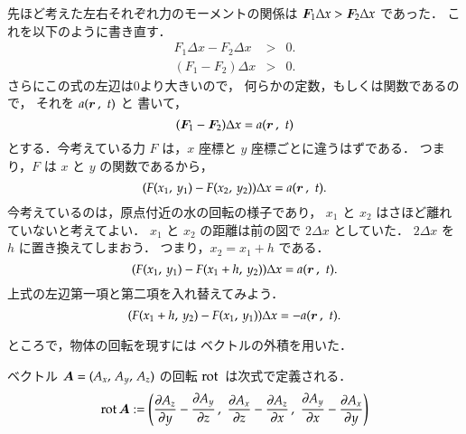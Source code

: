         先ほど考えた左右それぞれ力のモーメントの関係は $\boldsymbol{F}_{1}\Delta x > \boldsymbol{F}_{2}\Delta x$ であった．
        これを以下のように書き直す．
            \begin{align*}
                F_{1}\Delta x - F_{2}\Delta x &>& 0.  \\
                (F_{1} - F_{2})\Delta x &>& 0.
            \end{align*}
        さらにこの式の左辺は0より大きいので，
        何らかの定数，もしくは関数であるので，
        それを $a(\boldsymbol{r}\,,\,\,t)$ と
        書いて，
            \begin{equation*}
                (\boldsymbol{F}_{1} - \boldsymbol{F}_{2})\Delta x =a(\boldsymbol{r}\,,\,\,t)
            \end{equation*}
        とする．今考えている力 $F$ は，$x$ 座標と $y$ 座標ごとに違うはずである．
        つまり，$F$ は $x$ と $y$ の関数であるから，
            \begin{equation*}
                ( F(x_{1} ,\, y_{1}) - F(x_{2} ,\, y_{2}) )\Delta x =a(\boldsymbol{r}\,,\,\,t).
            \end{equation*}
        今考えているのは，原点付近の水の回転の様子であり，
        $x_{1}$ と $x_{2}$ はさほど離れていないと考えてよい．
        $x_{1}$ と $x_{2}$ の距離は前の図で $2\Delta x$ としていた．
        $2\Delta x$ を $h$ に置き換えてしまおう．
        つまり，$x_{2} = x_{1} + h$ である．
            \begin{equation*}
                ( F(x_{1} ,\, y_{1}) - F(x_{1} + h ,\, y_{2}) )\Delta x =a(\boldsymbol{r}\,,\,\,t).
            \end{equation*}
        上式の左辺第一項と第二項を入れ替えてみよう．
            \begin{equation*}
                ( F(x_{1} + h ,\, y_{2})  -  F(x_{1} ,\, y_{1})  )\Delta x = -a(\boldsymbol{r}\,,\,\,t).
            \end{equation*}

        ところで，物体の回転を現すには
        ベクトルの外積を用いた．

        ベクトル $\boldsymbol{A}=(A_{x},\, A_{y},\, A_{z})$ の回転 $\mathrm{rot}\,$ は次式で定義される．
            \begin{align}
                \mathrm{rot}\,\boldsymbol{A}:=
                \left(
                \frac{\partial A_{z}}{\partial y}-\frac{\partial A_{y}}{\partial z}\, ,\,\,
                \frac{\partial A_{x}}{\partial z}-\frac{\partial A_{z}}{\partial x}\, ,\,\,
                \frac{\partial A_{y}}{\partial x}-\frac{\partial A_{x}}{\partial y}
                \right)
            \end{align}

